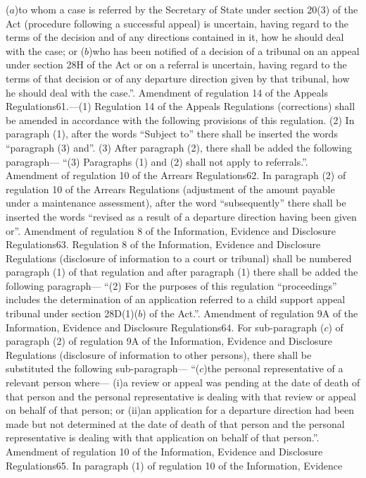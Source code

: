 \documentclass[a4paper]{article}
\begin{document}
($a$)to whom a case is referred by the Secretary of State under section 20(3) of
the Act (procedure following a successful appeal) is uncertain, having regard to
the terms of the decision and of any directions contained in it, how he should
deal with the case; or
($b$)who has been notified of a decision of a tribunal on an appeal under section
28H of the Act or on a referral is uncertain, having regard to the terms of that
decision or of any departure direction given by that tribunal, how he should
deal with the case.”.
Amendment of regulation 14 of the Appeals Regulations61.—(1) Regulation 14 of
the Appeals Regulations (corrections) shall be amended in accordance with the
following provisions of this regulation.
(2) In paragraph (1), after the words “Subject to” there shall be inserted the
words “paragraph (3) and”.
(3) After paragraph (2), there shall be added the following paragraph—
“(3) Paragraphs (1) and (2) shall not apply to referrals.”.
Amendment of regulation 10 of the Arrears Regulations62. In paragraph (2) of
regulation 10 of the Arrears Regulations (adjustment of the amount payable under
a maintenance assessment), after the word “subsequently” there shall be inserted
the words “revised as a result of a departure direction having been given or”.
Amendment of regulation 8 of the Information, Evidence and Disclosure
Regulations63. Regulation 8 of the Information, Evidence and Disclosure
Regulations (disclosure of information to a court or tribunal) shall be numbered
paragraph (1) of that regulation and after paragraph (1) there shall be added
the following paragraph—
“(2) For the purposes of this regulation “proceedings” includes the
determination of an application referred to a child support appeal tribunal
under section 28D(1)($b$) of the Act.”.
Amendment of regulation 9A of the Information, Evidence and Disclosure
Regulations64. For sub-paragraph ($c$) of paragraph (2) of regulation 9A of the
Information, Evidence and Disclosure Regulations (disclosure of information to
other persons), there shall be substituted the following sub-paragraph—
“($c$)the personal representative of a relevant person where—
(i)a review or appeal was pending at the date of death of that person and the
personal representative is dealing with that review or appeal on behalf of that
person; or
(ii)an application for a departure direction had been made but not determined at
the date of death of that person and the personal representative is dealing with
that application on behalf of that person.”.
Amendment of regulation 10 of the Information, Evidence and Disclosure
Regulations65. In paragraph (1) of regulation 10 of the Information, Evidence
\end{document}
